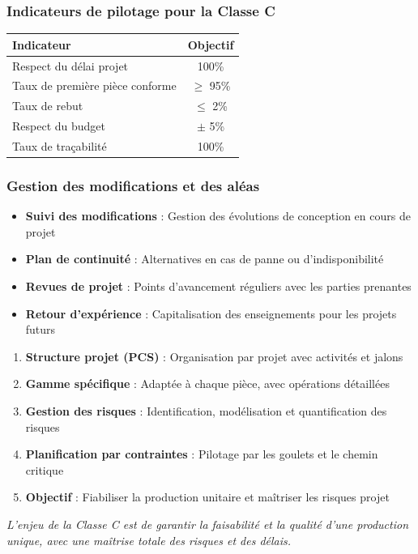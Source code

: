 \documentclass{article}
\begin{document}
\begin{table}[h]
\subsubsection{Indicateurs de pilotage pour la Classe C}

\begin{table}[h]
\centering
\begin{tabular}{|l|c|}
\hline
\textbf{Indicateur} & \textbf{Objectif} \\
\hline
Respect du délai projet & 100\% \\
Taux de première pièce conforme & $\geq$ 95\% \\
Taux de rebut & $\leq$ 2\% \\
Respect du budget & $\pm$ 5\% \\
Taux de traçabilité & 100\% \\
\hline
\end{tabular}
\end{table}

\subsubsection{Gestion des modifications et des aléas}

\begin{itemize}
    \item \textbf{Suivi des modifications} : Gestion des évolutions de conception en cours de projet
    \item \textbf{Plan de continuité} : Alternatives en cas de panne ou d'indisponibilité
    \item \textbf{Revues de projet} : Points d'avancement réguliers avec les parties prenantes
    \item \textbf{Retour d'expérience} : Capitalisation des enseignements pour les projets futurs
\end{itemize}

\begin{tcolorbox}[colback=blueclair, colframe=blue!70!black, title=Synthèse : Classe C]
\begin{enumerate}
    \item \textbf{Structure projet (PCS)} : Organisation par projet avec activités et jalons
    \item \textbf{Gamme spécifique} : Adaptée à chaque pièce, avec opérations détaillées
    \item \textbf{Gestion des risques} : Identification, modélisation et quantification des risques
    \item \textbf{Planification par contraintes} : Pilotage par les goulets et le chemin critique
    \item \textbf{Objectif} : Fiabiliser la production unitaire et maîtriser les risques projet
\end{enumerate}
\vspace{0.5em}
\textit{L'enjeu de la Classe C est de garantir la faisabilité et la qualité d'une production unique, avec une maîtrise totale des risques et des délais.}
\end{tcolorbox}


\end{table}
\end{document}
